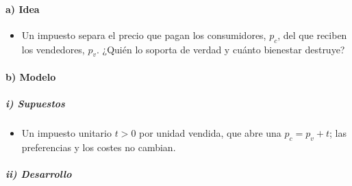 \documentclass[11pt]{article}
\begin{document}
\paragraph{a) Idea}

\begin{itemize}
\item Un impuesto separa el precio que pagan los consumidores, $p_c$, del que reciben los vendedores, $p_v$. ¿Quién lo soporta de verdad y cuánto bienestar destruye?
\end{itemize}

\paragraph{b) Modelo}

\subparagraph{i) Supuestos}

\begin{itemize}
\item Un impuesto unitario $t>0$ por unidad vendida, que abre una  $p_c=p_v+t$; las preferencias y los costes no cambian.
\end{itemize}

\subparagraph{ii) Desarrollo}
\end{document}
